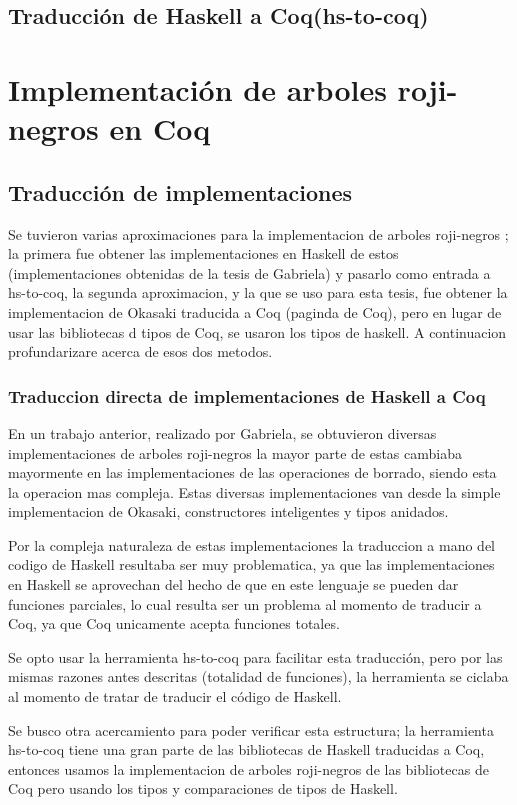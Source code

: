 \documentclass[letterpaper,12pt,oneside]{book}
\newcommand{\coq}{\textbf{Coq}}
\newcommand{\arns}{arboles roji-negros }
\theoremstyle{plain}
\theoremstyle{definition}
\theoremstyle{remark}
\begin{document}
\section{Traducción de Haskell a \coq (hs-to-coq)}

\chapter{Implementación de arboles roji-negros en \coq}

\section{Traducción de implementaciones}
Se tuvieron varias aproximaciones para la implementacion de \arns; la primera fue obtener las implementaciones en
Haskell de estos (implementaciones obtenidas de la tesis de Gabriela) y pasarlo como entrada a hs-to-coq, la 
segunda aproximacion, y la que se uso para esta tesis, fue obtener la implementacion de Okasaki traducida a Coq 
(paginda de Coq), pero en lugar de usar las bibliotecas d tipos de Coq, se usaron los tipos de haskell.
A continuacion profundarizare acerca de esos dos metodos.
\subsection{Traduccion directa de implementaciones de Haskell a Coq}
En un trabajo anterior, realizado por Gabriela, se obtuvieron diversas implementaciones de \arns la mayor parte de estas
cambiaba mayormente en las implementaciones de las operaciones de borrado, siendo esta la operacion mas compleja. 
Estas diversas implementaciones van desde la simple implementacion de Okasaki, constructores inteligentes y tipos anidados.

Por la compleja naturaleza de estas implementaciones la traduccion a mano del codigo de Haskell resultaba ser muy problematica,
ya que las implementaciones en Haskell se aprovechan del hecho de que en este lenguaje se pueden dar funciones parciales, 
lo cual resulta ser un problema al momento de traducir a Coq, ya que Coq unicamente acepta funciones totales.

Se opto usar la herramienta hs-to-coq para facilitar esta traducci\'on, pero por las mismas razones antes descritas (totalidad de funciones),
la herramienta se ciclaba al momento de tratar de traducir el c\'odigo de Haskell. 

Se busco otra acercamiento para poder verificar esta estructura; la herramienta hs-to-coq tiene una gran parte de las bibliotecas de Haskell 
traducidas a Coq, entonces usamos la implementacion de \arns de las bibliotecas de Coq pero usando los tipos y comparaciones de tipos de Haskell.
\end{document}
